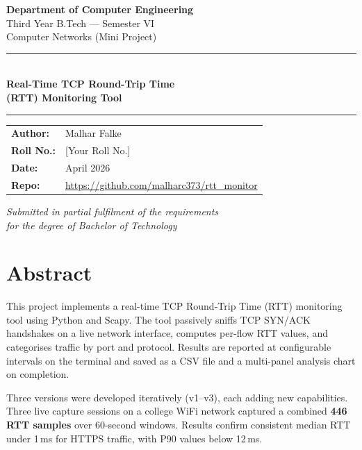 \documentclass[12pt,a4paper]{article}
\begin{document}
\begin{titlepage}
    \centering
    \vspace*{2cm}

    {\Large \textbf{Department of Computer Engineering}}\\[0.3em]
    {\large Third Year B.Tech --- Semester VI}\\[0.5em]
    {\large Computer Networks (Mini Project)}

    \vspace{1.5cm}
    \rule{\textwidth}{1.5pt}\\[0.4em]
    {\LARGE \textbf{Real-Time TCP Round-Trip Time}}\\[0.3em]
    {\LARGE \textbf{(RTT) Monitoring Tool}}\\[0.4em]
    \rule{\textwidth}{1.5pt}

    \vspace{1.5cm}
    \begin{tabular}{ll}
        \textbf{Author:}   & Malhar Falke \\[0.3em]
        \textbf{Roll No.:} & [Your Roll No.] \\[0.3em]
        \textbf{Date:}     & April 2026 \\[0.3em]
        \textbf{Repo:}     & \url{https://github.com/malharc373/rtt_monitor}
    \end{tabular}

    \vfill
    {\large \textit{Submitted in partial fulfilment of the requirements\\
    for the degree of Bachelor of Technology}}
\end{titlepage}

\tableofcontents
\newpage

\section{Abstract}

This project implements a real-time TCP Round-Trip Time (RTT) monitoring tool
using Python and Scapy. The tool passively sniffs TCP SYN/ACK handshakes on a
live network interface, computes per-flow RTT values, and categorises traffic
by port and protocol. Results are reported at configurable intervals on the
terminal and saved as a CSV file and a multi-panel analysis chart on completion.

Three versions were developed iteratively (v1--v3), each adding new capabilities.
Three live capture sessions on a college WiFi network captured a combined
\textbf{446 RTT samples} over 60-second windows. Results confirm consistent
median RTT under 1\,ms for HTTPS traffic, with P90 values below 12\,ms.
\end{document}
